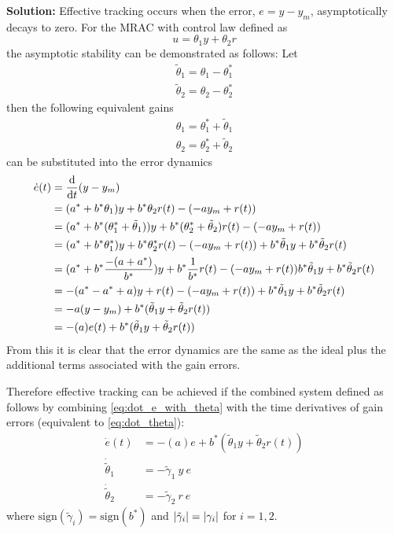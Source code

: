 \documentclass[letter]{article}
\begin{document}
\noindent
\textbf{Solution:}
Effective tracking occurs when the error, $e = y - y_m$, asymptotically decays to zero. For the MRAC with control law defined as $$u=\theta_1 y + \theta_2 r$$ the asymptotic stability can be demonstrated as follows:
Let
\begin{align}
	\tilde{\theta}_1 = \theta_1 - \theta_1^*\\
	\tilde{\theta}_2 = \theta_2 - \theta_2^*
\end{align}
then the following equivalent gains
\begin{align}
	\theta_1 = \theta_1^* + \tilde{\theta}_1\\
	\theta_2 = \theta_2^* + \tilde{\theta}_2
\end{align}
can be substituted into the error dynamics
\begin{align}
	\dot{e}(t) &= \dv{t} (y - y_m)\\
	&= (a^* + b^* \theta_1) y + b^* \theta_2 r(t) - ( -a y_m + r(t))\\
	&= (a^* + b^* (\theta_1^* + \tilde{\theta}_1)) y + b^* (\theta_2^* + \tilde{\theta}_2) r(t) - ( -a y_m + r(t))\\
	&=(a^* + b^* \theta_1^*) y + b^* \theta_2^* r(t) - ( -a y_m + r(t)) + b^* \tilde{\theta}_1 y + b^* \tilde{\theta}_2 r(t)\\
	&= (a^* + b^* \frac{-(a + a^*)}{b^*}) y + b^* \frac{1}{b^*} r(t) - ( -a y_m + r(t)) b^* \tilde{\theta}_1 y + b^* \tilde{\theta}_2 r(t)\\
	&= -(a^* - a^* + a)y + r(t) - (-a y_m + r(t)) + b^* \tilde{\theta}_1 y + b^* \tilde{\theta}_2 r(t)\\
	&= -a(y-y_m) + b^* (\tilde{\theta}_1 y + \tilde{\theta}_2 r(t))\\
	&= -(a)e(t) + b^* (\tilde{\theta}_1 y + \tilde{\theta}_2 r(t)) \label{eq:dot_e_with_theta}
\end{align}
From this it is clear that the error dynamics are the same as the ideal plus the additional terms associated with the gain errors.

Therefore effective tracking can be achieved if the combined system defined as follows by combining \eqref{eq:dot_e_with_theta} with the time derivatives of gain errors (equivalent to \eqref{eq:dot_theta}):
\begin{equation}\label{eq:addaptive_error_dynamics}
	\begin{aligned}
		\dot{e}(t) &= -(a)e + b^* (\tilde{\theta}_1 y + \tilde{\theta}_2 r(t))\\
		\dot{\tilde{\theta}}_1 &= - \tilde{\gamma}_1 \ y \ e\\
		\dot{\tilde{\theta}}_2 &= - \tilde{\gamma}_2 \ r \ e
	\end{aligned}
\end{equation}
where $\text{sign}(\tilde{\gamma}_i) = \text{sign}(b^*)$ and $\abs{\tilde{\gamma}_i} = \abs{\gamma_i}$ for $i=1,2$.
\end{document}
